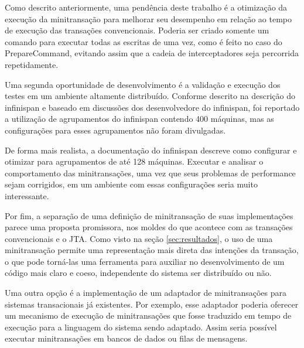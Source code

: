\documentclass[11pt,twoside,a4paper]{book}
\renewcommand{\chaptermark}[1]{\markboth{\MakeUppercase{#1}}{}}
\begin{document}
Como descrito anteriormente, uma pendência deste trabalho é a otimização da execução da minitransação para melhorar seu desempenho em relação ao tempo de execução das transações convencionais. Poderia ser criado somente um comando para executar todas as escritas de uma vez, como é feito no caso do PrepareCommand, evitando assim que a cadeia de interceptadores seja percorrida repetidamente.

Uma segunda oportunidade de desenvolvimento é a validação e execução dos testes em um ambiente altamente distribuído. Conforme descrito na descrição do infinispan e baseado em discussões dos desenvolvedore do infinispan, foi reportado a utilização de agrupamentos do infinispan contendo 400 máquinas, mas as configurações para esses agrupamentos não foram divulgadas. 

De forma mais realista, a documentação do infinispan descreve como configurar e otimizar para agrupamentos de até 128 máquinas. Executar e analisar o comportamento das minitransações, uma vez que seus problemas de performance sejam corrigidos, em um ambiente com essas configurações seria muito interessante. 

Por fim, a separação de uma definição de minitransação de suas implementações parece uma proposta promissora, nos moldes do que acontece com as transações convencionais e o JTA. Como visto na seção \ref{sec:resultados}, o uso de uma minitransação permite uma representação mais direta das intenções da transação, o que pode torná-las uma ferramenta para auxiliar no desenvolvimento de um código mais claro e coeso, independente do sistema ser distribuído ou não.

Uma outra opção é a implementação de um adaptador de minitransações para sistemas transacionais já existentes. Por exemplo, esse adaptador poderia oferecer um mecanismo de execução de minitransações que fosse traduzido em tempo de execução para a linguagem do sistema sendo adaptado. Assim seria possível executar minitransações em bancos de dados ou filas de mensagens.




\backmatter \singlespacing   %
\end{document}
